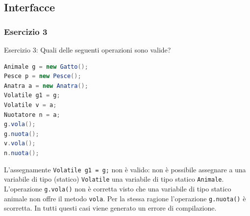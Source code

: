 \documentclass{article}
\begin{document}
\subsection{Interfacce}
\subsubsection{Esercizio 3}
\begin{framed}
Esercizio 3: Quali delle seguenti operazioni sono valide?
\end{framed}

\begin{lstlisting}[language=Java,escapechar=|]
Animale g = new Gatto(); 
Pesce p = new Pesce(); 
Anatra a = new Anatra(); 
Volatile g1 = g; 
Volatile v = a; 
Nuotatore n = a;
g.vola();
g.nuota();
v.vola();
n.nuota();
\end{lstlisting}
L'assegnamente \texttt{Volatile g1 = g;} non \`e valido: non \`e possibile assegnare a una variabile di tipo (statico) \texttt{Volatile} una variabile di tipo statico \texttt{Animale}. L'operazione \texttt{g.vola()} non \`e corretta visto che una variabile di tipo statico animale non offre il metodo \texttt{vola}. Per la stessa ragione l'operazione \texttt{g.nuota()} \`e scorretta. In tutti questi casi viene generato un errore di compilazione.









\clearpage







\nocite{*}
\end{document}
